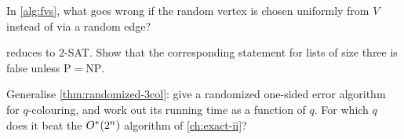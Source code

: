 \begin{exercise}
In \cref{alg:fvs}, what goes wrong if the random vertex is chosen uniformly
from $V$ instead of via a random edge?
\end{exercise}

\begin{exercise}
 reduces to $2$-SAT. Show that the corresponding
statement for lists of size three is false unless $\mathrm{P} = \mathrm{NP}$.
\end{exercise}

\begin{exercise}
Generalise \cref{thm:randomized-3col}: give a randomized one-sided error
algorithm for $q$-colouring, and work out its running time as a function of
$q$. For which $q$ does it beat the $O^{*}(2^n)$ algorithm of
\cref{ch:exact-ii}?
\end{exercise}

